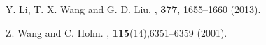 \documentclass[aps,showkeys,groupedaddress]{revtex4}
\begin{document}
\begin{thebibliography}{39}
Y. Li, T. X. Wang and G. D. Liu.
, {\bf{377}}, 1655--1660 {(2013)}.

Z. Wang and C. Holm.
, {\bf{115}}(14),6351--6359 {(2001)}.

\end{thebibliography}
\end{document}
